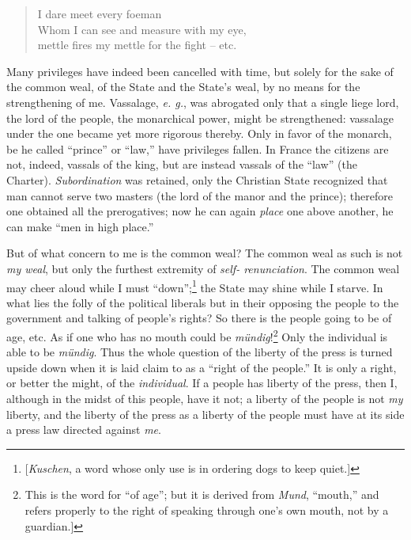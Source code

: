 \documentclass[12pt,a4paper]{book}
\begin{document}
\begin{quotation}

\noindent{} I dare meet every foeman\\
 Whom I can see and measure with my eye,\\
 mettle fires my mettle for the fight -- etc. \end{quotation}

\noindent{}Many privileges have indeed been cancelled with time, but solely 
for the sake of the common weal, of the State and the State's weal, by no 
means for the strengthening of me. Vassalage, \textit{e. g.}, was abrogated 
only that a single liege lord, the lord of the people, the monarchical power, 
might be strengthened: vassalage under the one became yet more rigorous 
thereby. Only in favor of the monarch, be he called ``prince'' or ``law,'' 
have privileges fallen. In France the citizens are not, indeed, vassals of the 
king, but are instead vassals of the ``law'' (the Charter). 
\textit{Subordination} was retained, only the Christian State recognized that 
man cannot serve two masters (the lord of the manor and the prince); therefore 
one obtained all the prerogatives; now he can again \textit{place} one above 
another, he can make ``men in high place.''

But of what concern to me is the common weal? The common weal as such is not 
\textit{my weal}, but only the furthest extremity of \textit{self- 
renunciation}. The common weal may cheer aloud while I must 
``down'';\footnote{[\textit{Kuschen}, a word whose only use is in ordering 
dogs to keep quiet.]} the State may shine while I starve. In what lies the 
folly of the political liberals but in their opposing the people to the 
government and talking of people's rights? So there is the people going to be 
of age, etc. As if one who has no mouth could be 
\textit{m\"undig}!\footnote{This is the word for ``of age''; but it is 
derived from \textit{Mund}, ``mouth,'' and refers properly to the right of 
speaking through one's own mouth, not by a guardian.]} Only the individual is 
able to be \textit{m\"undig}. Thus the whole question of the liberty of the 
press is turned upside down when it is laid claim to as a ``right of the 
people.'' It is only a right, or better the might, of the 
\textit{individual}. If a people has liberty of the press, then I, although in 
the midst of this people, have it not; a liberty of the people is not 
\textit{my} liberty, and the liberty of the press as a liberty of the people 
must have at its side a press law directed against \textit{me}.
\end{document}
